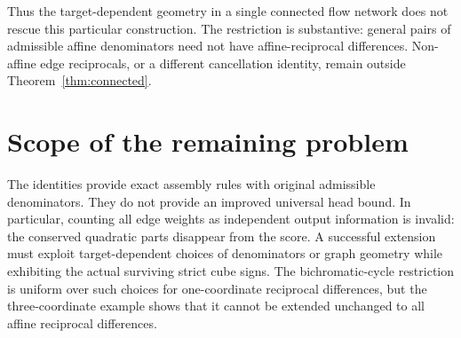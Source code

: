 \documentclass[11pt]{article}
\begin{document}
Thus the target-dependent geometry in a single connected flow network
does not rescue this particular construction. The restriction is
substantive: general pairs of admissible affine denominators need not
have affine-reciprocal differences. Non-affine edge reciprocals, or a
different cancellation identity, remain outside Theorem~\ref{thm:connected}.

\section{Scope of the remaining problem}

The identities provide exact assembly rules with original admissible
denominators. They do not provide an improved universal head bound.
In particular,
counting all edge weights as independent output information is invalid:
the conserved quadratic parts disappear from the score. A successful
extension must exploit target-dependent choices of denominators or
graph geometry while exhibiting the actual surviving strict cube signs.
The bichromatic-cycle restriction is uniform over such choices for
one-coordinate reciprocal differences, but the three-coordinate
example shows that it cannot be extended unchanged to all affine
reciprocal differences.
\end{document}
